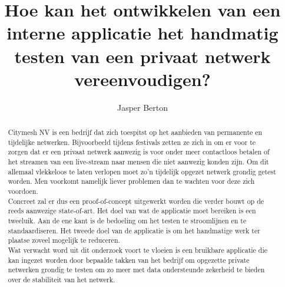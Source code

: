 \documentclass{hogent-article}
\title{Hoe kan het ontwikkelen van een interne applicatie het handmatig testen van een privaat netwerk vereenvoudigen?}
\author{Jasper Berton}
\begin{document}
\begin{abstract}
    
   Citymesh NV is een bedrijf dat zich toespitst op het aanbieden van permanente en tijdelijke netwerken. Bijvoorbeeld tijdens festivals zetten ze zich in om er voor te zorgen dat er een privaat netwerk aanwezig is voor onder meer contactloos betalen of het streamen van een live-stream naar mensen die niet aanwezig konden zijn. Om dit allemaal vlekkeloos te laten verlopen moet zo'n tijdelijk opgezet netwerk grondig getest worden. Men voorkomt namelijk liever problemen dan te wachten voor deze zich voordoen.
    \\
    
   Concreet zal er dus een proof-of-concept uitgewerkt worden die verder bouwt op de reeds aanwezige state-of-art. Het doel van wat de applicatie moet bereiken is een tweeluik. Aan de ene kant is de bedoeling om het testen te stroomlijnen en te standaardiseren. Het tweede doel van de applicatie is om het handmatige werk ter plaatse zoveel mogelijk te reduceren. \\
   
   Wat verwacht word uit dit onderzoek voort te vloeien is een bruikbare applicatie die kan ingezet worden door bepaalde takken van het bedrijf om opgezette private netwerken grondig te testen om zo meer met data ondersteunde zekerheid te bieden over de stabiliteit van het netwerk.
 
\end{abstract}

\tableofcontents



\printbibliography[heading=bibintoc]
\end{document}

